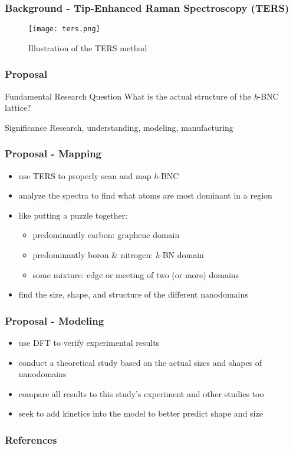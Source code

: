 \documentclass{beamer}
\begin{document}
\begin{frame}
  \frametitle{Background - Tip-Enhanced Raman Spectroscopy (TERS)}
  \begin{figure}
    \texttt{[image: ters.png]}
    \caption{Illustration of the TERS method\cite{ters}}
  \end{figure}
\end{frame}

\begin{frame}
  \frametitle{Proposal}
  \begin{block}{Fundamental Research Question}
    What is the actual structure of the \textit{h}-BNC lattice?
  \end{block}
  \begin{block}{Significance}
    Research, understanding, modeling, manufacturing
  \end{block}
\end{frame}

\begin{frame}
  \frametitle{Proposal - Mapping}
  \begin{itemize}
    \item use TERS to properly scan and map \textit{h}-BNC
    \item analyze the spectra to find what atoms are most dominant in a region
    \item like putting a puzzle together:
    \begin{itemize}
      \item predominantly carbon: graphene domain
      \item predominantly boron \& nitrogen: \textit{h}-BN domain
      \item some mixture: edge or meeting of two (or more) domains
    \end{itemize}
    \item find the size, shape, and structure of the different nanodomains
  \end{itemize}
\end{frame}

\begin{frame}
  \frametitle{Proposal - Modeling}
  \begin{itemize}
    \item use DFT to verify experimental results
    \item conduct a theoretical study based on the actual sizes and shapes of nanodomains
    \item compare all results to this study's experiment and other studies too
    \item seek to add kinetics into the model to better predict shape and size
  \end{itemize}
\end{frame}

\begin{frame}
  \frametitle{References}
  
\end{frame}
\end{document}
